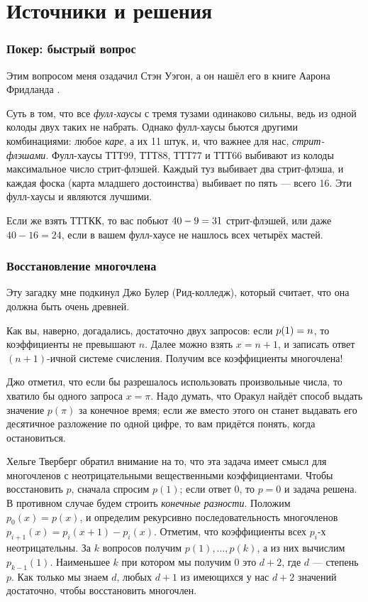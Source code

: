 \section*{Источники и решения}

\subsubsection*{Покер: быстрый вопрос}

Этим вопросом меня озадачил Стэн Уэгон, а он нашёл его в книге Аарона Фридланда \cite{18}.

Суть в том, что все \emph{фулл-хаусы} с тремя тузами одинаково сильны, ведь из одной колоды двух таких не набрать.
Однако фулл-хаусы бьются другими комбинациями: любое \emph{каре}, а их 11 штук, и, что важнее для нас, \emph{стрит-флэшами}.
Фулл-хаусы ТТТ99, ТТТ88, ТТТ77 и ТТТ66 выбивают из колоды максимальное число стрит-флэшей.
Каждый туз выбивает два стрит-флэша, и каждая фоска (карта младшего достоинства) выбивает по пять --- всего 16.
Эти фулл-хаусы и являются лучшими.

Если же взять ТТТКК, то вас побьют $40 - 9 \z= 31$ стрит-флэшей, или даже $40 - 16 = 24$, если в вашем фулл-хаусе не нашлось всех четырёх мастей.

\subsubsection*{Восстановление многочлена}

Эту загадку мне подкинул Джо Булер (Рид-колледж), который считает, что она должна быть очень древней.

Как вы, наверно, догадались, достаточно двух запросов:
если $p(1)\z=n$, то коэффициенты не превышают $n$.
Далее можно взять $x = n + 1$, и записать ответ $(n + 1)$-ичной системе счисления.
Получим все коэффициенты многочлена!

Джо отметил, что если бы разрешалось использовать произвольные числа, то хватило бы одного запроса $x = \pi$.
Надо думать, что Оракул найдёт способ выдать значение $p(\pi)$ за конечное время;
если же вместо этого он станет выдавать его десятичное разложение по одной цифре,
то вам придётся понять, когда остановиться.

Хельге Тверберг обратил внимание на то, что эта задача имеет смысл для многочленов с неотрицательными вещественными коэффициентами.
Чтобы восстановить $p$, сначала спросим $p(1)$; если ответ $0$, то $p = 0$ и задача решена.
В противном случае будем строить \emph{конечные разности}.
Положим $p_0(x) = p(x)$, и определим рекурсивно последовательность многочленов $p_{i+1}(x) = p_i (x+1) - p_i(x)$.
Отметим, что коэффициенты всех $p_i$-х неотрицательны.
За $k$ вопросов получим $p(1),\dots,p(k)$,
а из них вычислим $p_{k-1}(1)$.
Наименьшее $k$ при котором мы получим $0$ это $d+2$, где $d$ --- степень $p$.
Как только мы знаем $d$, любых $d+1$ из имеющихся у нас $d+2$ значений достаточно, чтобы восстановить многочлен.

